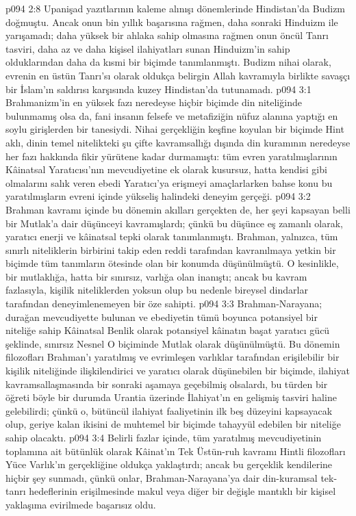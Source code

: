 \vs p094 2:8 Upanişad yazıtlarının kaleme alınışı dönemlerinde Hindistan’da Budizm doğmuştu. Ancak onun bin yıllık başarısına rağmen, daha sonraki Hinduizm ile yarışamadı; daha yüksek bir ahlaka sahip olmasına rağmen onun öncül Tanrı tasviri, daha az ve daha kişisel ilahiyatları sunan Hinduizm’in sahip olduklarından daha da kısmi bir biçimde tanımlanmıştı. Budizm nihai olarak, evrenin en üstün Tanrı’sı olarak oldukça belirgin Allah kavramıyla birlikte savaşçı bir İslam’ın saldırısı karşısında kuzey Hindistan’da tutunamadı.
\vs p094 3:1 Brahmanizm’in en yüksek fazı neredeyse hiçbir biçimde din niteliğinde bulunmamış olsa da, fani insanın felsefe ve metafiziğin nüfuz alanına yaptığı en soylu girişlerden bir tanesiydi. Nihai gerçekliğin keşfine koyulan bir biçimde Hint aklı, dinin temel nitelikteki şu çifte kavramsallığı dışında din kuramının neredeyse her fazı hakkında fikir yürütene kadar durmamıştı: tüm evren yaratılmışlarının Kâinatsal Yaratıcısı’nın mevcudiyetine ek olarak kusursuz, hatta kendisi gibi olmalarını salık veren ebedi Yaratıcı’ya erişmeyi amaçlarlarken bahse konu bu yaratılmışların evreni içinde yükseliş halindeki deneyim gerçeği.
\vs p094 3:2 Brahman kavramı içinde bu dönemin akılları gerçekten de, her şeyi kapsayan belli bir Mutlak’a dair düşünceyi kavramışlardı; çünkü bu düşünce eş zamanlı olarak, yaratıcı enerji ve kâinatsal tepki olarak tanımlanmıştı. Brahman, yalnızca, tüm sınırlı niteliklerin birbirini takip eden reddi tarafından kavranılmaya yetkin bir biçimde tüm tanımların ötesinde olan bir konumda düşünülmüştü. O kesinlikle, bir mutlaklığa, hatta bir sınırsız, varlığa olan inanıştı; ancak bu kavram fazlasıyla, kişilik niteliklerden yoksun olup bu nedenle bireysel dindarlar tarafından deneyimlenemeyen bir öze sahipti.
\vs p094 3:3 Brahman\hyp{}Narayana; durağan mevcudiyette bulunan ve ebediyetin tümü boyunca potansiyel bir niteliğe sahip Kâinatsal Benlik olarak potansiyel kâinatın başat yaratıcı gücü şeklinde, sınırsız Nesnel O biçiminde Mutlak olarak düşünülmüştü. Bu dönemin filozofları Brahman’ı yaratılmış ve evrimleşen varlıklar tarafından erişilebilir bir kişilik niteliğinde ilişkilendirici ve yaratıcı olarak düşünebilen bir biçimde, ilahiyat kavramsallaşmasında bir sonraki aşamaya geçebilmiş olsalardı, bu türden bir öğreti böyle bir durumda Urantia üzerinde İlahiyat’ın en gelişmiş tasviri haline gelebilirdi; çünkü o, bütüncül ilahiyat faaliyetinin ilk beş düzeyini kapsayacak olup, geriye kalan ikisini de muhtemel bir biçimde tahayyül edebilen bir niteliğe sahip olacaktı.
\vs p094 3:4 Belirli fazlar içinde, tüm yaratılmış mevcudiyetinin toplamına ait bütünlük olarak Kâinat’ın Tek Üstün\hyp{}ruh kavramı Hintli filozofları Yüce Varlık’ın gerçekliğine oldukça yaklaştırdı; ancak bu gerçeklik kendilerine hiçbir şey sunmadı, çünkü onlar, Brahman\hyp{}Narayana’ya dair din\hyp{}kuramsal tek\hyp{}tanrı hedeflerinin erişilmesinde makul veya diğer bir değişle mantıklı bir kişisel yaklaşıma evirilmede başarısız oldu.
